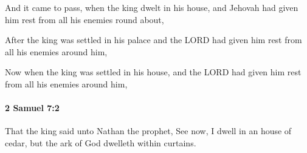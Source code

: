 			\begin{versebox}
					\item[BHS] 
					\item[ASV] And it came to pass, when the king dwelt in his house, and Jehovah had given him rest from all his enemies round about,
					\item[NIV] After the king was settled in his palace and the LORD had given him rest from all his enemies around him,
					\item[NRSV] Now when the king was settled in his house, and the LORD had given him rest from all his enemies around him,
			\end{versebox}

		\paragraph{2 Samuel 7:2} %
			\label{2SAMUEL-7-2}

			That the king said unto Nathan the prophet, See now, I dwell in an house of cedar, but the ark of God dwelleth within curtains.

